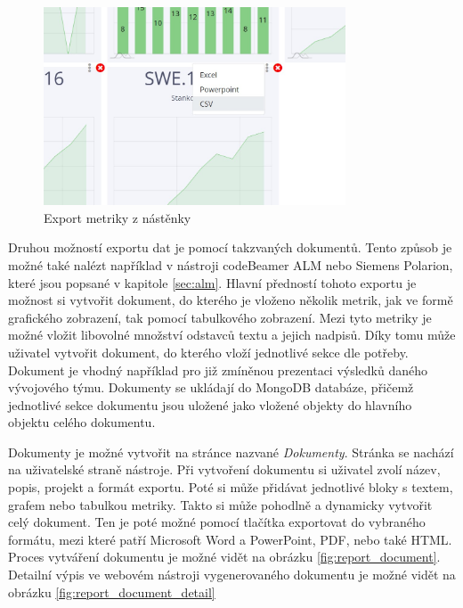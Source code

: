 \documentclass[czech,master,public,dept460,male,cpdeclaration,oneside]{diploma}
\begin{document}
\begin{figure}[!ht]
    \centering
    \includegraphics[width=0.8\textwidth]{Diplomka/Figures/dashboard_export.jpg}
    \caption{Export metriky z nástěnky}
    \label{fig:dashboard_export}
\end{figure}

Druhou možností exportu dat je pomocí takzvaných dokumentů. Tento způsob je možné také nalézt například v nástroji codeBeamer ALM nebo Siemens Polarion, které jsou popsané v kapitole \ref{sec:alm}. Hlavní předností tohoto exportu je možnost si vytvořit dokument, do kterého je vloženo několik metrik, jak ve formě grafického zobrazení, tak pomocí tabulkového zobrazení. Mezi tyto metriky je možné vložit libovolné množství odstavců textu a jejich nadpisů. Díky tomu může uživatel vytvořit dokument, do kterého vloží jednotlivé sekce dle potřeby. Dokument je vhodný například pro již zmíněnou prezentaci výsledků daného vývojového týmu. Dokumenty se ukládají do MongoDB databáze, přičemž jednotlivé sekce dokumentu jsou uložené jako vložené objekty do hlavního objektu celého dokumentu.

Dokumenty je možné vytvořit na stránce nazvané \textit{Dokumenty}. Stránka se nachází na uživatelské straně nástroje. Při vytvoření dokumentu si uživatel zvolí název, popis, projekt a formát exportu. Poté si může přidávat  jednotlivé bloky s textem, grafem nebo tabulkou metriky. Takto si může pohodlně a dynamicky vytvořit celý dokument. Ten je poté možné pomocí tlačítka exportovat do vybraného formátu, mezi které patří Microsoft Word a PowerPoint, PDF, nebo také HTML. Proces vytváření dokumentu je možné vidět na obrázku \ref{fig:report_document}. Detailní výpis ve webovém nástroji vygenerovaného dokumentu je možné vidět na obrázku \ref{fig:report_document_detail} 
\end{document}
